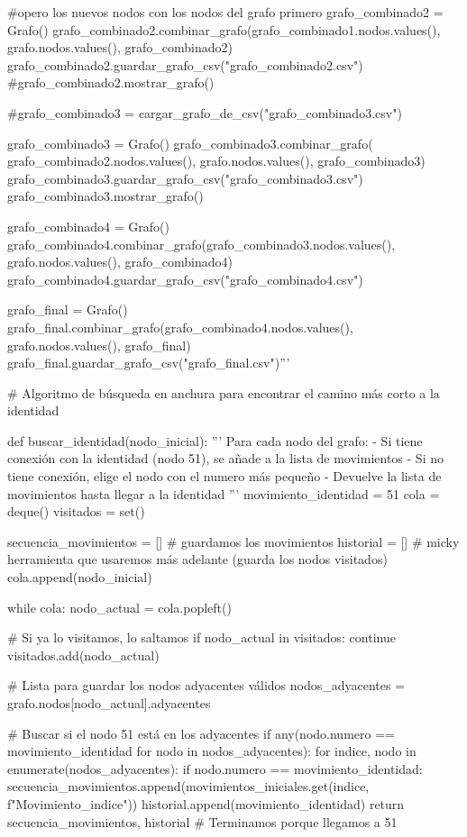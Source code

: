 #opero los nuevos nodos con los nodos del grafo primero
grafo_combinado2 = Grafo()
grafo_combinado2.combinar_grafo(grafo_combinado1.nodos.values(), grafo.nodos.values(), grafo_combinado2)
grafo_combinado2.guardar_grafo_csv("grafo_combinado2.csv")
#grafo_combinado2.mostrar_grafo()

#grafo_combinado3 = cargar_grafo_de_csv("grafo_combinado3.csv")

grafo_combinado3 = Grafo()
grafo_combinado3.combinar_grafo( grafo_combinado2.nodos.values(), grafo.nodos.values(), grafo_combinado3)
grafo_combinado3.guardar_grafo_csv("grafo_combinado3.csv")
grafo_combinado3.mostrar_grafo()

grafo_combinado4 = Grafo()
grafo_combinado4.combinar_grafo(grafo_combinado3.nodos.values(), grafo.nodos.values(), grafo_combinado4)
grafo_combinado4.guardar_grafo_csv("grafo_combinado4.csv")

grafo_final = Grafo()
grafo_final.combinar_grafo(grafo_combinado4.nodos.values(), grafo.nodos.values(), grafo_final)
grafo_final.guardar_grafo_csv("grafo_final.csv")'''


# Algoritmo de búsqueda en anchura para encontrar el camino más corto a la identidad

def buscar_identidad(nodo_inicial):
    ''' 
    Para cada nodo del grafo:
    - Si tiene conexión con la identidad (nodo 51), se añade a la lista de movimientos
    - Si no tiene conexión, elige el nodo con el numero más pequeño
    - Devuelve la lista de movimientos hasta llegar a la identidad
    '''
    movimiento_identidad = 51
    cola = deque()
    visitados = set()
    
    secuencia_movimientos = [] # guardamos los movimientos
    historial = [] # micky herramienta que usaremos más adelante (guarda los nodos visitados)
    cola.append(nodo_inicial)
    
    while cola:
        nodo_actual = cola.popleft()
        
        # Si ya lo visitamos, lo saltamos
        if nodo_actual in visitados:
            continue
        visitados.add(nodo_actual)
        
        # Lista para guardar los nodos adyacentes válidos
        nodos_adyacentes = grafo.nodos[nodo_actual].adyacentes
        
        # Buscar si el nodo 51 está en los adyacentes
        if any(nodo.numero == movimiento_identidad for nodo in nodos_adyacentes):
            for indice, nodo in enumerate(nodos_adyacentes):
                if nodo.numero == movimiento_identidad:
                    secuencia_movimientos.append(movimientos_iniciales.get(indice, f"Movimiento_{indice}"))
                    historial.append(movimiento_identidad)
                    return secuencia_movimientos, historial  # Terminamos porque llegamos a 51
        
